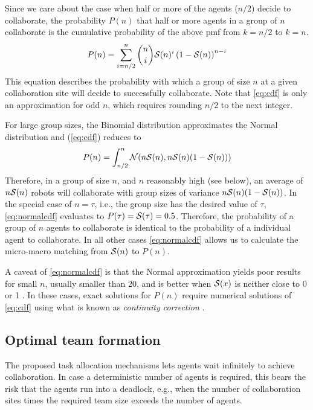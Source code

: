 \documentclass[Main.tex]{subfiles}
\begin{document}
Since we care about the case when half or more of the agents (${n/2}$) decide to collaborate, the probability $P(n)$ that half or more agents in a group of $n$ collaborate is the cumulative probability of the above pmf from $k = {n/2}$ to $k = n$. 
\begin{equation}
	P(n) = \sum\limits_{i={n/2}}^{n}\binom{n}{i}\mathcal{S}(n)^{i}\left(1 - \mathcal{S}(n)\right)^{n - i}\label{eq:cdf}
\end{equation}
This equation describes the probability with which a group of size $n$ at a given collaboration site will decide to successfully collaborate.  Note that \eqref{eq:cdf} is only an approximation for odd $n$, which requires rounding $n/2$ to the next integer. 

For large group sizes, the Binomial distribution approximates the Normal distribution and (\ref{eq:cdf}) reduces to 
\begin{equation}
P(n)=\int_{n/2}^{n} \mathcal{N}(n\mathcal{S}(n),n\mathcal{S}(n)(1-\mathcal{S}(n)))\label{eq:normalcdf}
\end{equation}
Therefore, in a group of size $n$, and $n$ reasonably high (see below), an average of $n\mathcal{S}(n)$ robots will collaborate with group sizes of variance $n\mathcal{S}(n)(1-\mathcal{S}(n))$. In the special case of $n=\tau$, i.e., the group size has the desired value of $\tau$, \eqref{eq:normalcdf} evaluates to $P(\tau) = \mathcal{S}(\tau)=0.5$. Therefore, the probability of a group of $n$ agents to collaborate is identical to the probability of a individual agent to collaborate. In all other cases \eqref{eq:normalcdf} allows us to calculate the micro-macro matching from $\mathcal{S}(n)$ to $P(n)$.  

A caveat of \eqref{eq:normalcdf} is that the Normal approximation yields poor results for small $n$, usually smaller than 20, and is better when $\mathcal{S}(x)$ is neither close to 0 or 1 \cite{box78}. In these cases, exact solutions for $P(n)$ require numerical solutions of \eqref{eq:cdf} using what is known as \emph{continuity correction} \cite{Feller1945}.



\subsection*{Optimal team formation}
The proposed task allocation mechanisms lets agents wait infinitely to achieve collaboration. In case a deterministic number of agents is required, this bears the risk that the agents run into a deadlock, e.g., when the number of collaboration sites times the required team size exceeds the number of agents. 
\end{document}
